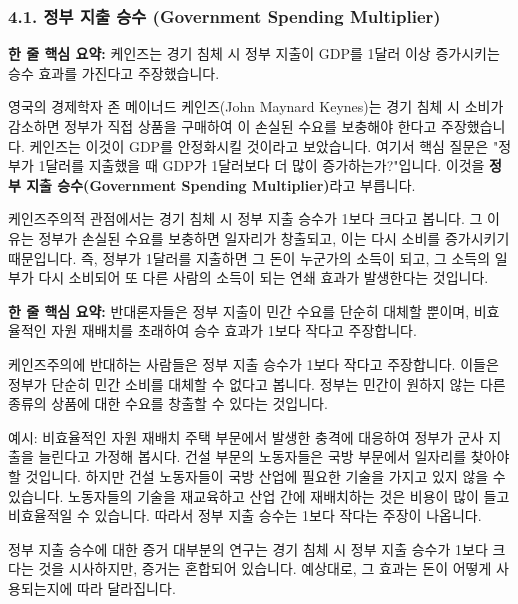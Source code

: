 \documentclass[11pt,a4paper]{article}
\begin{document}
\subsubsection*{4.1. 정부 지출 승수 (Government Spending Multiplier)}

\begin{tcolorbox}[mybox={케인즈주의적 관점}]
    \textbf{한 줄 핵심 요약:} 케인즈는 경기 침체 시 정부 지출이 GDP를 1달러 이상 증가시키는 승수 효과를 가진다고 주장했습니다.
\end{tcolorbox}

영국의 경제학자 존 메이너드 케인즈(John Maynard Keynes)는 경기 침체 시 소비가 감소하면 정부가 직접 상품을 구매하여 이 손실된 수요를 보충해야 한다고 주장했습니다. 케인즈는 이것이 GDP를 안정화시킬 것이라고 보았습니다. 여기서 핵심 질문은 "정부가 1달러를 지출했을 때 GDP가 1달러보다 더 많이 증가하는가?"입니다. 이것을 \textbf{정부 지출 승수(Government Spending Multiplier)}라고 부릅니다.

케인즈주의적 관점에서는 경기 침체 시 정부 지출 승수가 1보다 크다고 봅니다. 그 이유는 정부가 손실된 수요를 보충하면 일자리가 창출되고, 이는 다시 소비를 증가시키기 때문입니다. 즉, 정부가 1달러를 지출하면 그 돈이 누군가의 소득이 되고, 그 소득의 일부가 다시 소비되어 또 다른 사람의 소득이 되는 연쇄 효과가 발생한다는 것입니다.

\begin{tcolorbox}[mybox={케인즈주의 반대 관점}]
    \textbf{한 줄 핵심 요약:} 반대론자들은 정부 지출이 민간 수요를 단순히 대체할 뿐이며, 비효율적인 자원 재배치를 초래하여 승수 효과가 1보다 작다고 주장합니다.
\end{tcolorbox}

케인즈주의에 반대하는 사람들은 정부 지출 승수가 1보다 작다고 주장합니다. 이들은 정부가 단순히 민간 소비를 대체할 수 없다고 봅니다. 정부는 민간이 원하지 않는 다른 종류의 상품에 대한 수요를 창출할 수 있다는 것입니다.

\begin{examplebox}{예시: 비효율적인 자원 재배치}
    주택 부문에서 발생한 충격에 대응하여 정부가 군사 지출을 늘린다고 가정해 봅시다. 건설 부문의 노동자들은 국방 부문에서 일자리를 찾아야 할 것입니다. 하지만 건설 노동자들이 국방 산업에 필요한 기술을 가지고 있지 않을 수 있습니다. 노동자들의 기술을 재교육하고 산업 간에 재배치하는 것은 비용이 많이 들고 비효율적일 수 있습니다. 따라서 정부 지출 승수는 1보다 작다는 주장이 나옵니다.
\end{examplebox}

\begin{summarybox}{정부 지출 승수에 대한 증거}
    대부분의 연구는 경기 침체 시 정부 지출 승수가 1보다 크다는 것을 시사하지만, 증거는 혼합되어 있습니다. 예상대로, 그 효과는 돈이 어떻게 사용되는지에 따라 달라집니다.
\end{summarybox}
\end{document}
